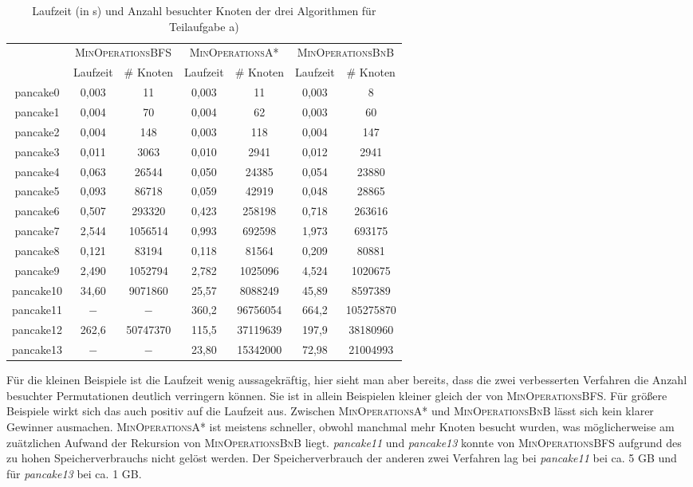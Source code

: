 \documentclass[a4paper, 10pt, ngerman]{article}
\begin{document}
\begin{table}[H]
    \centering
    \begin{tabular}{c c c c c c c}
        & \multicolumn{2}{c}{\textsc{MinOperationsBFS}} &
        \multicolumn{2}{c}{\textsc{MinOperationsA*}} &
        \multicolumn{2}{c}{\textsc{MinOperationsBnB}} \\
        & Laufzeit & \# Knoten & Laufzeit & \# Knoten & Laufzeit & \# Knoten \\
        \cmidrule{1-7}
        pancake0 & 0,003 & 11 & 0,003 & 11 & 0,003 & 8 \\
        pancake1 & 0,004 & 70 & 0,004 & 62 & 0,003 & 60  \\
        pancake2 & 0,004 & 148 & 0,003 & 118 & 0,004 & 147  \\
        pancake3 & 0,011 & 3063 & 0,010 & 2941 & 0,012 & 2941  \\
        pancake4 & 0,063 & 26544 & 0,050 & 24385 & 0,054 & 23880 \\
        pancake5 & 0,093 & 86718 & 0,059 & 42919 & 0,048 & 28865 \\
        pancake6 & 0,507 & 293320 & 0,423 & 258198 & 0,718 & 263616 \\
        pancake7 & 2,544 & 1056514 & 0,993 & 692598 & 1,973 & 693175 \\
        pancake8 & 0,121 & 83194 & 0,118 & 81564 & 0,209 & 80881 \\
        pancake9 & 2,490 & 1052794 & 2,782 & 1025096 & 4,524 & 1020675 \\
        pancake10 & 34,60 & 9071860 & 25,57 & 8088249 & 45,89 & 8597389 \\
        pancake11 & $-$ & $-$ & 360,2 & 96756054 & 664,2 & 105275870 \\
        pancake12 & 262,6 & 50747370 & 115,5 & 37119639 & 197,9 & 38180960 \\
        pancake13 & $-$ & $-$ & 23,80 & 15342000 & 72,98 & 21004993 \\
    \end{tabular}
    \caption{Laufzeit (in s) und Anzahl besuchter Knoten der drei Algorithmen für Teilaufgabe a)}
\end{table}

Für die kleinen Beispiele ist die Laufzeit wenig aussagekräftig, hier sieht man aber bereits, dass die zwei verbesserten Verfahren die Anzahl besuchter Permutationen deutlich verringern können. Sie ist in allein Beispielen kleiner gleich der von \textsc{MinOperationsBFS}. Für größere Beispiele wirkt sich das auch positiv auf die Laufzeit aus. Zwischen \textsc{MinOperationsA*} und \textsc{MinOperationsBnB} lässt sich kein klarer Gewinner ausmachen. \textsc{MinOperationsA*} ist meistens schneller, obwohl manchmal mehr Knoten besucht wurden, was möglicherweise am zuätzlichen Aufwand der Rekursion von \textsc{MinOperationsBnB} liegt. \emph{pancake11} und \emph{pancake13} konnte von \textsc{MinOperationsBFS} aufgrund des zu hohen Speicherverbrauchs nicht gelöst werden. Der Speicherverbrauch der anderen zwei Verfahren lag bei \emph{pancake11} bei ca. 5 GB und für \emph{pancake13} bei ca. 1 GB.
\end{document}
